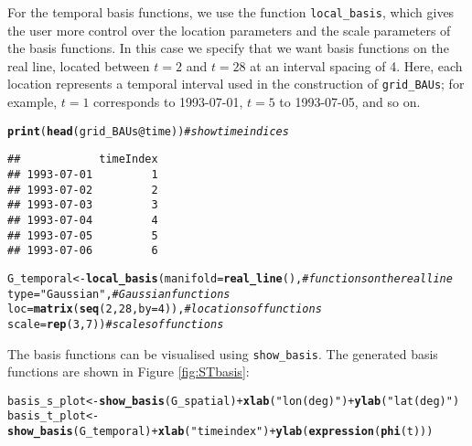 \documentclass{article}\usepackage[]{graphicx}\usepackage[]{color}
\makeatletter
\newcommand{\hlnum}[1]{\textcolor[rgb]{0.686,0.059,0.569}{#1}}%
\newcommand{\hlstr}[1]{\textcolor[rgb]{0.192,0.494,0.8}{#1}}%
\newcommand{\hlcom}[1]{\textcolor[rgb]{0.678,0.584,0.686}{\textit{#1}}}%
\newcommand{\hlopt}[1]{\textcolor[rgb]{0,0,0}{#1}}%
\newcommand{\hlstd}[1]{\textcolor[rgb]{0.345,0.345,0.345}{#1}}%
\newcommand{\hlkwb}[1]{\textcolor[rgb]{0.69,0.353,0.396}{#1}}%
\newcommand{\hlkwc}[1]{\textcolor[rgb]{0.333,0.667,0.333}{#1}}%
\newcommand{\hlkwd}[1]{\textcolor[rgb]{0.737,0.353,0.396}{\textbf{#1}}}%
\newenvironment{kframe}{%
 \def\at@end@of@kframe{}%
 \ifinner\ifhmode%
  \def\at@end@of@kframe{\end{minipage}}%
  \begin{minipage}{\columnwidth}%
 \fi\fi%
 \def\FrameCommand##1{\hskip\@totalleftmargin \hskip-\fboxsep
 \colorbox{shadecolor}{##1}\hskip-\fboxsep
     \hskip-\linewidth \hskip-\@totalleftmargin \hskip\columnwidth}%
 \MakeFramed {\advance\hsize-\width
   \@totalleftmargin\z@ \linewidth\hsize
   \@setminipage}}%
 {\par\unskip\endMakeFramed%
 \at@end@of@kframe}
\newenvironment{knitrout}{}{} %
\renewcommand{\tt} {\texttt}
\makeatother
\begin{document}
\noindent For the temporal basis functions, we use the function \tt{local\_basis}, which gives the user more control over the location parameters and the scale parameters of the basis functions. In this case we specify that we want basis functions on the real line, located between $t = 2$ and $t = 28$ at an interval spacing of 4. Here, each location represents a temporal interval used in the construction of \tt{grid\_BAUs}; for example, $t = 1$ corresponds to 1993-07-01, $t = 5$ to 1993-07-05, and so on.

\begin{knitrout}
\color{fgcolor}\begin{kframe}
\begin{alltt}
\hlkwd{print}\hlstd{(}\hlkwd{head}\hlstd{(grid_BAUs}\hlopt{@}\hlkwc{time}\hlstd{))}                                \hlcom{# show time indices}
\end{alltt}
\begin{verbatim}
##            timeIndex
## 1993-07-01         1
## 1993-07-02         2
## 1993-07-03         3
## 1993-07-04         4
## 1993-07-05         5
## 1993-07-06         6
\end{verbatim}
\begin{alltt}
\hlstd{G_temporal} \hlkwb{<-} \hlkwd{local_basis}\hlstd{(}\hlkwc{manifold} \hlstd{=} \hlkwd{real_line}\hlstd{(),}          \hlcom{# functions on the real line}
                           \hlkwc{type} \hlstd{=} \hlstr{"Gaussian"}\hlstd{,}              \hlcom{# Gaussian functions}
                           \hlkwc{loc} \hlstd{=} \hlkwd{matrix}\hlstd{(}\hlkwd{seq}\hlstd{(}\hlnum{2}\hlstd{,}\hlnum{28}\hlstd{,}\hlkwc{by}\hlstd{=}\hlnum{4}\hlstd{)),}   \hlcom{# locations of functions}
                           \hlkwc{scale} \hlstd{=} \hlkwd{rep}\hlstd{(}\hlnum{3}\hlstd{,}\hlnum{7}\hlstd{))}               \hlcom{# scales of functions}
\end{alltt}
\end{kframe}
\end{knitrout}

\noindent The basis functions can be visualised using \tt{show\_basis}. The generated basis functions are shown in Figure \ref{fig:STbasis}:

\begin{knitrout}
\color{fgcolor}\begin{kframe}
\begin{alltt}
\hlstd{basis_s_plot} \hlkwb{<-} \hlkwd{show_basis}\hlstd{(G_spatial)} \hlopt{+} \hlkwd{xlab}\hlstd{(}\hlstr{"lon (deg)"}\hlstd{)} \hlopt{+} \hlkwd{ylab}\hlstd{(}\hlstr{"lat (deg)"}\hlstd{)}
\hlstd{basis_t_plot} \hlkwb{<-} \hlkwd{show_basis}\hlstd{(G_temporal)} \hlopt{+} \hlkwd{xlab}\hlstd{(}\hlstr{"time index"}\hlstd{)} \hlopt{+} \hlkwd{ylab}\hlstd{(}\hlkwd{expression}\hlstd{(}\hlkwd{phi}\hlstd{(t)))}
\end{alltt}
\end{kframe}
\end{knitrout}
\end{document}
